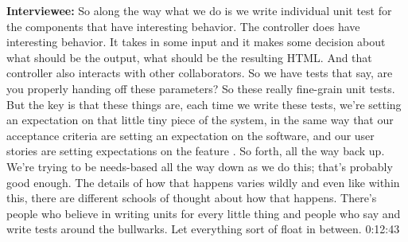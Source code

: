 \textbf{Interviewee:} So along the way what we do is we write individual unit test for the components that have interesting behavior.  The controller does have interesting behavior.  It takes in some input and it makes some decision about what should be the output, what should be the resulting HTML.  And that controller also interacts with other collaborators.  So we have tests that say, are you properly handing off these parameters?  So these really fine-grain unit tests. But the key is that these things are, each time we write these tests, we're setting an expectation on that little tiny piece of the system, in the same way that our acceptance criteria are setting an expectation on the software, and our user stories are setting expectations on the feature .  So forth, all the way back up. We're trying to be needs-based  all the way down as we do this; that's probably good enough.  The details of how that happens varies wildly and even like within this, there are different schools of thought about how that happens.  There's people who believe in writing units for every little thing and people who say  and write tests around the bullwarks.  Let everything sort of float in between.  0:12:43